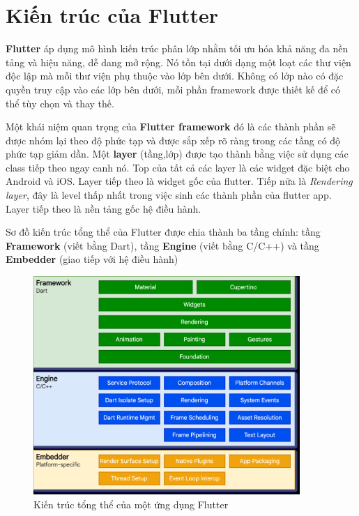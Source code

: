 \documentclass[../DoAn.tex]{subfiles}
\numberwithin{figure}{chapter}
\begin{document}
\section{Kiến trúc của Flutter}
\textbf{Flutter} áp dụng mô hình kiến trúc phân lớp nhằm tối ưu hóa khả năng đa nền tảng và hiệu năng, dễ dang mở rộng. Nó tồn tại dưới dạng một loạt các thư viện độc lập mà mỗi thư viện phụ thuộc vào lớp bên dưới. Không có lớp nào có đặc quyền truy cập vào các lớp bên dưới, mỗi phần framework được thiết kế để có thể tùy chọn và thay thế.

Một khái niệm quan trọng của \textbf{Flutter framework} đó là các thành phần sẽ được nhóm lại theo độ phức tạp và được sắp xếp rõ ràng trong các tầng có độ phức tạp giảm dần. Một \textbf{layer} (tầng,lớp) được tạo thành bằng việc sử dụng các class tiếp theo ngay canh nó. Top của tất cả các layer là các widget đặc biệt cho Android và iOS. Layer tiếp theo là widget gốc của flutter. Tiếp nữa là \textit{Rendering layer}, đây là level thấp nhất trong việc sinh các thành phần của flutter app. Layer tiếp theo là nền tảng gốc hệ điều hành.

Sơ đồ kiến trúc tổng thể của Flutter được chia thành ba tầng chính: tầng \textbf{Framework} (viết bằng Dart), tầng \textbf{Engine} (viết bằng C/C++) và tầng \textbf{Embedder} (giao tiếp với hệ điều hành)

\begin{figure}[H]
    \centering
    \includegraphics[width=0.9\textwidth]{Hinhve/Chuong5/flutterArchitecture.png}
    \caption{Kiến trúc tổng thể của một ứng dụng Flutter}
    \label{fig:flutterarchitecture}
\end{figure}
\end{document}
